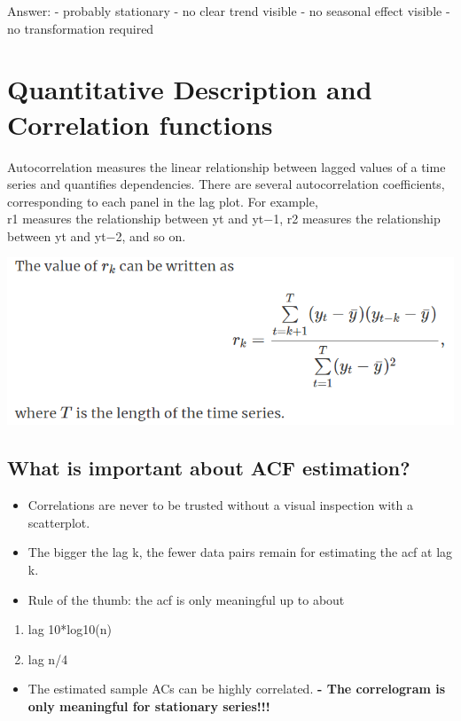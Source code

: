 \documentclass[
]{article}
\providecommand{\tightlist}{%
  \setlength{\itemsep}{0pt}\setlength{\parskip}{0pt}}
\begin{document}
Answer: - probably stationary - no clear trend visible - no seasonal
effect visible - no transformation required

\hypertarget{quantitative-description-and-correlation-functions}{%
\section{Quantitative Description and Correlation
functions}\label{quantitative-description-and-correlation-functions}}

Autocorrelation measures the linear relationship between lagged values
of a time series and quantifies dependencies. There are several
autocorrelation coefficients, corresponding to each panel in the lag
plot. For example,\\
r1 measures the relationship between yt and yt−1, r2 measures the
relationship between yt and yt−2, and so on.

\includegraphics[width=0.5\linewidth]{auto}

\hypertarget{what-is-important-about-acf-estimation}{%
\subsection{What is important about ACF
estimation?}\label{what-is-important-about-acf-estimation}}

\begin{itemize}
\tightlist
\item
  Correlations are never to be trusted without a visual inspection with
  a scatterplot.
\item
  The bigger the lag k, the fewer data pairs remain for estimating the
  acf at lag k.
\item
  Rule of the thumb: the acf is only meaningful up to about
\end{itemize}

\begin{enumerate}
\def\labelenumi{\alph{enumi})}
\tightlist
\item
  lag 10*log10(n)
\item
  lag n/4
\end{enumerate}

\begin{itemize}
\tightlist
\item
  The estimated sample ACs can be highly correlated. \textbf{- The
  correlogram is only meaningful for stationary series!!!}
\end{itemize}
\end{document}
